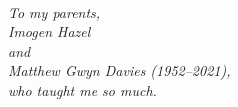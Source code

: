 \newpage
\thispagestyle{empty}
~
\vfill
\begin{center}
\itshape%
To my parents,\\
Imogen Hazel\\
and\\
Matthew Gwyn Davies (1952--2021),\\
who taught me so much.
\end{center}
\vfill
~
\newpage
\thispagestyle{empty}
~
